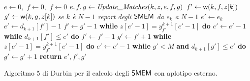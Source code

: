 \begin{algorithm}
  \begin{algorithmic}[1]   
    \State $e\gets 0,\,\,f\gets 0,\,\,f\gets 0$
    \State $e,f,g\gets \mbox{\textit{Update\_Matches}}(k, z, e, f, g)$
    \EndFor
    \EndFunction
    \State
    \State $f'\gets \mbox{\rm {\sf w}}(k, f, z[k])$
    \State $g'\gets \mbox{\rm {\sf w}}(k, g, z[k])$
    \Comment\textit{{se $k$ è $N-1$ report degli $\mbox{\rm {\sf SMEM}}$ da $e_k$ a $N-1$}}
    \State $e'\gets e_k$
    \Else
    \State $e'\gets d_{k+1}[f']-1$
    \State $f'\gets g'-1$
    \State \textbf{while} $z[e'-1]=y_{f'}^{k+1}[e'-1]$ \textbf{do} $e'\gets
    e'-1$
    \State \textbf{while} $d_{k+1}[f']\leq e'$ \textbf{do} $f'\gets f'-1$
    \Else
    \State $g'\gets f'+1$
    \State \textbf{while} $z[e'-1]=y_{f'}^{k+1}[e'-1]$ \textbf{do}  $e'\gets
    e'-1$ 
    \State \textbf{while} $g'<M$ \textbf{and} $d_{k+1}[g']\leq e'$ \textbf{do}
    $g'\gets g'+1$ 
    \EndIf
    \EndIf
    \State \textbf{return} $e',f',g'$
    \EndFunction
  \end{algorithmic}
  \caption{\footnotesize{Algoritmo 5 di Durbin per il calcolo degli $\mbox{\rm {\sf SMEM}}$ con
  aplotipo esterno.}}
  \label{algo:dur5}
\end{algorithm}
